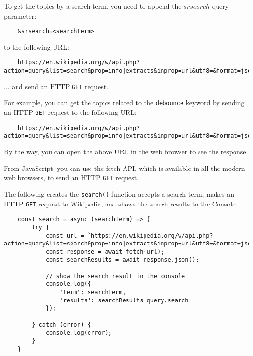 \documentclass[11pt]{article}
\begin{document}
\noindent
To get the topics by a search term, you need to append the $srsearch$
query parameter:

\begin{lstlisting}
    &srsearch=<searchTerm>
\end{lstlisting}

\noindent
to the following URL:

\begin{lstlisting}
    https://en.wikipedia.org/w/api.php?action=query&list=search&prop=info|extracts&inprop=url&utf8=&format=json&origin=*&srlimit=10
\end{lstlisting}

\noindent
... and send an HTTP \verb|GET| request.
\newline

\noindent
For example, you can get the topics related to the \verb|debounce| keyword by
sending an HTTP \verb|GET| request to the following URL:

\begin{lstlisting}
    https://en.wikipedia.org/w/api.php?action=query&list=search&prop=info|extracts&inprop=url&utf8=&format=json&origin=*&srlimit=10&srsearch=debounce
\end{lstlisting}

\noindent
By the way, you can open the above URL in the web browser to see the response.
\newline

\noindent
From JavaScript, you can use the fetch API, which is available in all
the modern web browsers, to send an HTTP \verb|GET| request.
\newline

\noindent
The following creates the \verb|search()| function accepts a search term,
makes an HTTP \verb|GET| request to Wikipedia, and shows the search results
to the Console:

\begin{lstlisting}
    const search = async (searchTerm) => {
        try {
            const url = `https://en.wikipedia.org/w/api.php?action=query&list=search&prop=info|extracts&inprop=url&utf8=&format=json&origin=*&srlimit=10&srsearch=${searchTerm}`;
            const response = await fetch(url);
            const searchResults = await response.json();

            // show the search result in the console
            console.log({
                'term': searchTerm,
                'results': searchResults.query.search
            });

        } catch (error) {
            console.log(error);
        }
    }
\end{lstlisting}
\end{document}
